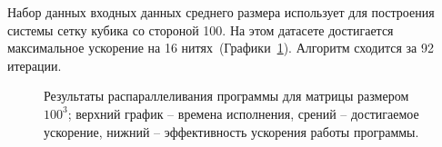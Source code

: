 \documentclass[12pt, oneside, a4paper]{article}
\begin{document}
Набор данных входных данных среднего размера использует для построения системы сетку кубика со стороной 100. На этом датасете достигается максимальное ускорение на 16 нитях~(Графики~\ref{fig:m100}). Алгоритм сходится за 92 итерации.

\begin{figure}[h!]
\caption{Результаты распараллеливания программы для матрицы размером $100^3$; верхний график -- времена исполнения, срений -- достигаемое ускорение, нижний -- эффективность ускорения работы программы.}
\label{fig:m100}
\end{figure}
\end{document}
